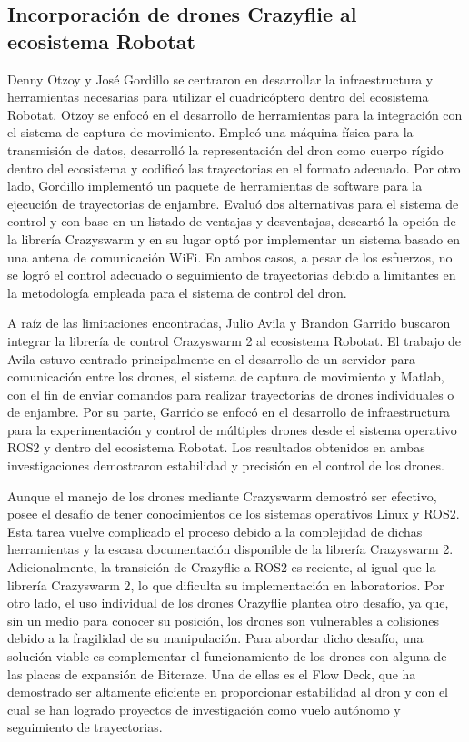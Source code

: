 \subsection*{Incorporación de drones Crazyflie al ecosistema Robotat}
Denny Otzoy \cite{Otzoy2023_tesis} y José Gordillo \cite{Gordillo2023_tesis} se centraron en desarrollar la infraestructura y herramientas necesarias para utilizar el cuadricóptero dentro del ecosistema Robotat. Otzoy se enfocó en el desarrollo de herramientas para la integración con el sistema de captura de movimiento. Empleó una máquina física para la transmisión de datos, desarrolló la representación del dron como cuerpo rígido dentro del ecosistema y codificó las trayectorias en el formato adecuado. Por otro lado, Gordillo implementó un paquete de herramientas de software para la ejecución de trayectorias de enjambre. Evaluó dos alternativas para el sistema de control y con base en un listado de ventajas y desventajas, descartó la opción de la librería Crazyswarm y en su lugar optó por implementar un sistema basado en una antena de comunicación WiFi. En ambos casos, a pesar de los esfuerzos, no se logró el control adecuado o seguimiento de trayectorias debido a limitantes en la metodología empleada para el sistema de control del dron. 

A raíz de las limitaciones encontradas, Julio Avila \cite{Avila2023_tesis} y Brandon Garrido \cite{Garrido2023_tesis} buscaron integrar la librería de control Crazyswarm 2 al ecosistema Robotat. El trabajo de Avila estuvo centrado principalmente en el desarrollo de un servidor para comunicación entre los drones, el sistema de captura de movimiento y Matlab, con el fin de enviar comandos para realizar trayectorias de drones individuales o de enjambre. Por su parte, Garrido se enfocó en el desarrollo de infraestructura para la experimentación y control de múltiples drones desde el sistema operativo ROS2 y dentro del ecosistema Robotat. Los resultados obtenidos en ambas investigaciones demostraron estabilidad y precisión en el control de los drones. 

Aunque el manejo de los drones mediante Crazyswarm demostró ser efectivo, posee el desafío de tener conocimientos de los sistemas operativos Linux y ROS2. Esta tarea vuelve complicado el proceso debido a la complejidad de dichas herramientas y la escasa documentación disponible de la librería Crazyswarm 2. Adicionalmente, la transición de Crazyflie a ROS2 es reciente, al igual que la librería Crazyswarm 2, lo que dificulta su implementación en laboratorios. Por otro lado, el uso individual de los drones Crazyflie plantea otro desafío, ya que, sin un medio para conocer su posición, los drones son vulnerables a colisiones debido a la fragilidad de su manipulación. Para abordar dicho desafío, una solución viable es complementar el funcionamiento de los drones con alguna de las placas de expansión de Bitcraze. Una de ellas es el Flow Deck, que ha demostrado ser altamente eficiente en proporcionar estabilidad al dron y con el cual se han logrado proyectos de investigación como vuelo autónomo y seguimiento de trayectorias.


